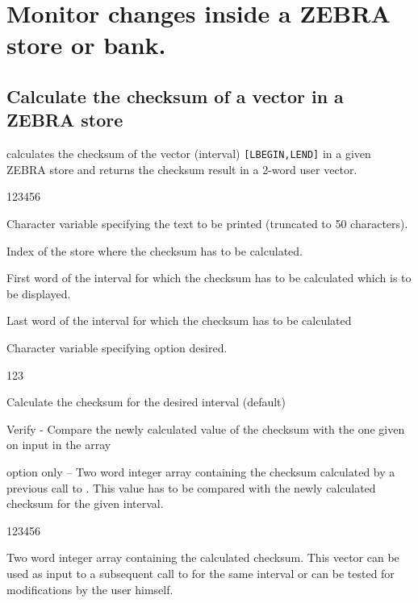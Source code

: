 \newpage

\section{Monitor changes inside a ZEBRA store or bank.}
\subsection{Calculate the checksum of a vector in a ZEBRA store}


\Action
{} calculates the checksum of the vector (interval)
{\tt [LBEGIN,LEND]}
in a given ZEBRA store and returns the checksum result in a 2-word
user vector.

\Idesc

\begin{DLtt}{123456}
\item[CHTEXT]Character variable specifying the text to be printed
(truncated to 50 characters).
\item[IXSTOR]Index of the store where the checksum has to be calculated.
\item[LBEGIN]First word of the interval for which the checksum
has to be calculated
which is to be displayed.
\item[LEND]Last word of the interval for which the checksum
has to be calculated
\item[CHOPT]Character variable specifying option desired.
\begin{DLtt}{123}
\item['C']Calculate the checksum for the desired interval (default)
\item['V']Verify - Compare the newly calculated value of the checksum with the
one given on input in the array 
\end{DLtt}
\item[*ISUM*] option only -- Two word integer array containing the
checksum calculated by a previous call to . This value has to be
compared with the newly calculated checksum for the given interval.
\end{DLtt}
\Odesc
\begin{DLtt}{123456}
\item[*ISUM*]Two word integer array containing the calculated checksum.
\newline This vector can be used as input to a subsequent call to
 for the same interval or can be tested for modifications by the
user himself.
\end{DLtt}

